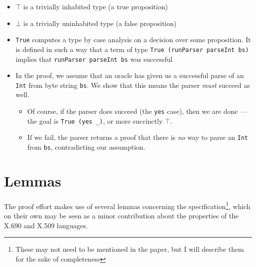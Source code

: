 \documentclass[11pt]{article}
\begin{document}
\begin{itemize}
\item \(\top\) is a trivially inhabited type (a true proposition)
\item \(\bot\) is a trivially uninhabited type (a false proposition)
\item \texttt{True} computes a type by case analysis on a decision over some
proposition. It is defined in such a way that a term of type
\texttt{True (runParser parseInt bs)} implies that \texttt{runParser parseInt bs} was
successful

\item In the proof, we assume that an oracle has given us a successful parse of
an \texttt{Int} from byte string \texttt{bs}. We show that this means the parser \emph{must}
succeed as well.

\begin{itemize}
\item Of course, if the parser does succeed (the \texttt{yes} case), then we are done
--- the goal is \texttt{True (yes \_)}, or more succinctly \(\top\).
\item If we fail, the parser returns a proof that there is \emph{no} way to parse
an \texttt{Int} from \texttt{bs}, contradicting our assumption.
\end{itemize}
\end{itemize}

\section{Lemmas}
\label{sec:org9e19669}

The proof effort makes use of several lemmas concerning the
specification\footnote{These may not need to be mentioned in the paper, but I will
describe them for the sake of completeness}, which on their own may be seen
as a minor contribution about the properties of the X.690 and X.509 languages.
\end{document}
